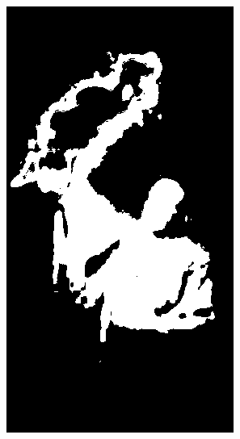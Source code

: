 \begin{figure}[h]
\begin{subfigure}[b]{0.18\textwidth}
         \includegraphics[width=\textwidth]{images/results/base/lighting_fire_dyc.png}
     \end{subfigure}
     \begin{subfigure}[b]{0.18\textwidth}
         \centering

\end{subfigure}
\end{figure}
